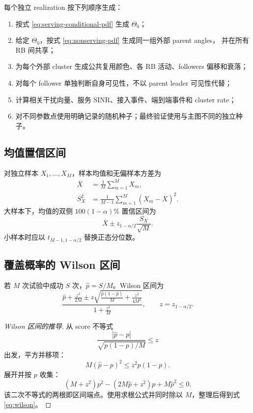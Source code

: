 \documentclass[UTF8,a4paper,11pt]{ctexart}
\begin{document}
每个独立 realization 按下列顺序生成：
\begin{enumerate}[leftmargin=2em]
  \item 按式 \eqref{eq:serving-conditional-pdf} 生成 $\Theta_0$；
  \item 给定 $\Theta_0$，按式 \eqref{eq:nonserving-pdf} 生成同一组外部 parent angles，
  并在所有 RB 间共享；
  \item 为每个外部 cluster 生成公共复用颜色、各 RB 活动、followers 偏移和衰落；
  \item 对每个 follower 单独判断自身可见性，不以 parent leader 可见性代替；
  \item 计算相关干扰向量、服务 SINR、接入事件、端到端事件和 cluster rate；
  \item 对不同参数点使用明确记录的随机种子；最终验证使用与主图不同的独立种子。
\end{enumerate}

\subsection{均值置信区间}

对独立样本 $X_1,\ldots,X_M$，样本均值和无偏样本方差为
\begin{align}
 \overline X
 &=\frac1M\sum_{m=1}^{M}X_m,\label{eq:sample-mean}\\
 S_X^2
 &=\frac{1}{M-1}\sum_{m=1}^{M}(X_m-\overline X)^2.
 \label{eq:sample-var}
\end{align}
大样本下，均值的双侧 $100(1-\alpha)\%$ 置信区间为
\begin{equation}
 \overline X
 \pm z_{1-\alpha/2}\frac{S_X}{\sqrt M}.
 \label{eq:mean-ci}
\end{equation}
小样本时应以 $t_{M-1,1-\alpha/2}$ 替换正态分位数。

\subsection{覆盖概率的 Wilson 区间}

若 $M$ 次试验中成功 $S$ 次，$\widehat p=S/M$。Wilson 区间为
\begin{equation}
 \frac{
 \widehat p+\frac{z^2}{2M}
 \pm
 z\sqrt{
 \frac{\widehat p(1-\widehat p)}{M}
 +\frac{z^2}{4M^2}
 }
 }{
 1+\frac{z^2}{M}
 },
 \qquad z=z_{1-\alpha/2}.
 \label{eq:wilson}
\end{equation}

\begin{proof}[Wilson 区间的推导]
从 score 不等式
\begin{equation}
 \frac{|\widehat p-p|}
 {\sqrt{p(1-p)/M}}\leq z
\end{equation}
出发，平方并移项：
\begin{equation}
 M(\widehat p-p)^2\leq z^2p(1-p).
\end{equation}
展开并按 $p$ 收集：
\begin{equation}
 (M+z^2)p^2-(2M\widehat p+z^2)p+M\widehat p^2\leq0.
\end{equation}
该二次不等式的两根即区间端点。使用求根公式并同时除以 $M$，整理后得到式
\eqref{eq:wilson}。
\end{proof}
\end{document}
